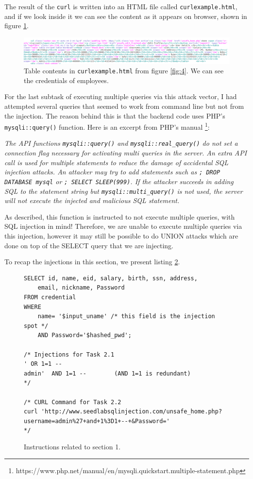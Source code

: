 \documentclass[12pt,reqno]{amsart}
\newcommand{\code}[1]{\texttt{#1}}
\begin{document}
The result of the \code{curl} is written into an HTML file called \code{curlexample.html}, and if we look inside it we can see the content as it appears on browser, shown in figure \ref{fig:5}.

\begin{figure}[h]
\includegraphics[width=\linewidth]{screenshots/CURL_EXAMPLE_GEDIT.png}
\caption{Table contents in \code{curlexample.html} from figure \ref{fig:4}. We can see the credentials of employees.}
\label{fig:5}
\end{figure}

For the last subtask of executing multiple queries via this attack vector, I had attempted several queries that seemed to work from command line but not from the injection. The reason behind this is that the backend code uses PHP's \code{mysqli::query()} function. Here is an excerpt from PHP's manual \footnote{https://www.php.net/manual/en/mysqli.quickstart.multiple-statement.php}: 

\textit{The API functions \code{mysqli::query()} and \code{mysqli::real\_query()} do not set a connection flag necessary for activating multi queries in the server. An extra API call is used for multiple statements to reduce the damage of accidental SQL injection attacks. An attacker may try to add statements such as \code{; DROP DATABASE mysql} or \code{; SELECT SLEEP(999)}. If the attacker succeeds in adding SQL to the statement string but \code{mysqli::multi\_query()} is not used, the server will not execute the injected and malicious SQL statement.}

As described, this function is instructed to not execute multiple queries, with SQL injection in mind! Therefore, we are unable to execute multiple queries via this injection, however it may still be possible to do UNION attacks which are done on top of the SELECT query that we are injecting.

To recap the injections in this section, we present listing \ref{lst:1}.
\begin{figure}[h]
\begin{lstlisting}[style=SQLStyle, firstnumber=1]
SELECT id, name, eid, salary, birth, ssn, address, 
	email, nickname, Password
FROM credential
WHERE 
	name= '$input_uname' /* this field is the injection spot */
	AND Password='$hashed_pwd';

/* Injections for Task 2.1
' OR 1=1 -- 
admin'  AND 1=1 --        (AND 1=1 is redundant)
*/

/* CURL Command for Task 2.2
curl 'http://www.seedlabsqlinjection.com/unsafe_home.php?username=admin%27+and+1%3D1+--+&Password='
*/

\end{lstlisting} 
\caption{Instructions related to section 1.}
\label{lst:1}
\end{figure}
\end{document}
